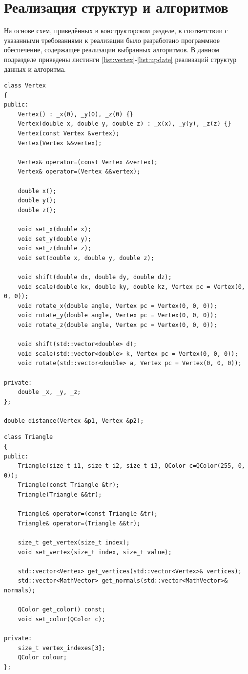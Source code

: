 \section{Реализация структур и алгоритмов}
\hspace{0.6cm}На основе схем, приведённых в конструкторском разделе, в соответствии с указанными требованиями к реализации было разработано программное обеспечение, содержащее реализации выбранных алгоритмов. В данном подразделе приведены листинги \ref{list:vertex}-\ref{list:update} реализаций структур данных и алгоритма.

\begin{lstlisting}[caption=Класс <<вершина>> Vertex, label=list:vertex]
class Vertex
{
public:
	Vertex() : _x(0), _y(0), _z(0) {}
	Vertex(double x, double y, double z) : _x(x), _y(y), _z(z) {}
	Vertex(const Vertex &vertex);
	Vertex(Vertex &&vertex);
	
	Vertex& operator=(const Vertex &vertex);
	Vertex& operator=(Vertex &&vertex);
	
	double x();
	double y();
	double z();
	
	void set_x(double x);
	void set_y(double y);
	void set_z(double z);
	void set(double x, double y, double z);
	
	void shift(double dx, double dy, double dz);
	void scale(double kx, double ky, double kz, Vertex pc = Vertex(0, 0, 0));
	void rotate_x(double angle, Vertex pc = Vertex(0, 0, 0));
	void rotate_y(double angle, Vertex pc = Vertex(0, 0, 0));
	void rotate_z(double angle, Vertex pc = Vertex(0, 0, 0));
	
	void shift(std::vector<double> d);
	void scale(std::vector<double> k, Vertex pc = Vertex(0, 0, 0));
	void rotate(std::vector<double> a, Vertex pc = Vertex(0, 0, 0));

private:
	double _x, _y, _z;
};

double distance(Vertex &p1, Vertex &p2);
\end{lstlisting}

\begin{lstlisting}[caption=Класс <<грань>> Trinangle, label=list:triangle]
class Triangle
{
public:
	Triangle(size_t i1, size_t i2, size_t i3, QColor c=QColor(255, 0, 0));
	Triangle(const Triangle &tr);
	Triangle(Triangle &&tr);
	
	Triangle& operator=(const Triangle &tr);
	Triangle& operator=(Triangle &&tr);
	
	size_t get_vertex(size_t index);
	void set_vertex(size_t index, size_t value);
	
	std::vector<Vertex> get_vertices(std::vector<Vertex>& vertices);
	std::vector<MathVector> get_normals(std::vector<MathVector>& normals);
	
	QColor get_color() const;
	void set_color(QColor c);

private:
	size_t vertex_indexes[3];
	QColor colour;
};
\end{lstlisting}


